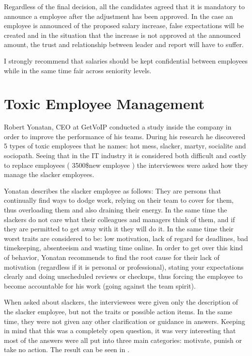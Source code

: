 Regardless of the final decision, all the candidates agreed that it is mandatory to announce a employee after the adjustment has been approved. In the case an employee is announced of the proposed salary increase, false expectations will be created and in the situation that the increase is not approved at the announced amount, the trust and relationship between leader and report will have to suffer. 

I strongly recommend that salaries should be kept confidential between employees while in the same time fair across seniority levels.

\section{Toxic Employee Management}
\label{sec:toxic}
Robert Yonatan, CEO at GetVoIP conducted a study inside the company in order to improve the performance of his teams. During his research \cite{toxic} he discovered 5 types of toxic employees that he names: hot mess, slacker, martyr, socialite and sociopath. Seeing that in the IT industry it is considered both difficult and costly to replace employees ( 3500\$new employee \cite{cost-replace}) the interviewees were asked how they manage the slacker employees.

Yonatan describes the slacker employee as follows: They are persons that continually find ways to dodge work, relying on their team to cover for them, thus overloading them and also draining their energy. In the same time the slackers do not care what their colleagues and managers think of them, and if they are permitted to get away with it they will do it. In the same time their worst traits are considered to be: low motivation, lack of regard for deadlines, bad timekeeping, absenteeism and wasting time online. In order to get over this kind of behavior, Yonatan recommends to find the root cause for their lack of motivation (regardless if it is personal or professional), stating your expectations clearly and doing unscheduled reviews or checkups, thus forcing the employee to become accountable for his work (going against the team spirit).

When asked about slackers, the interviewees were given only the description of the slacker employee, but not the traits or possible action items. In the same time, they were not given any other clarification or guidance in answers. Keeping in mind that this was a completely open question, it was very interesting that most of the answers were all put into three main categories: motivate, punish or take no action. The result can be seen in .

